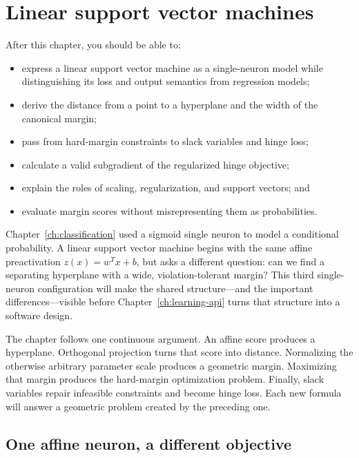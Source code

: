 \chapter{Linear support vector machines}
\label{ch:linear-svm}

\begin{learningobjectives}
After this chapter, you should be able to:
\begin{itemize}
  \item express a linear support vector machine as a single-neuron model while
  distinguishing its loss and output semantics from regression models;
  \item derive the distance from a point to a hyperplane and the width of the
  canonical margin;
  \item pass from hard-margin constraints to slack variables and hinge loss;
  \item calculate a valid subgradient of the regularized hinge objective;
  \item explain the roles of scaling, regularization, and support vectors; and
  \item evaluate margin scores without misrepresenting them as probabilities.
\end{itemize}
\end{learningobjectives}

\begin{chapterconnection}
Chapter~\ref{ch:classification} used a sigmoid single neuron to model a
conditional probability. A linear support vector machine begins with the same
affine preactivation $z(x)=w^Tx+b$, but asks a different question: can we find
a separating hyperplane with a wide, violation-tolerant margin? This third
single-neuron configuration will make the shared structure---and the important
differences---visible before Chapter~\ref{ch:learning-api} turns that structure
into a software design.
\end{chapterconnection}

The chapter follows one continuous argument. An affine score produces a
hyperplane. Orthogonal projection turns that score into distance. Normalizing
the otherwise arbitrary parameter scale produces a geometric margin.
Maximizing that margin produces the hard-margin optimization problem. Finally,
slack variables repair infeasible constraints and become hinge loss. Each new
formula will answer a geometric problem created by the preceding one.

\section{One affine neuron, a different objective}

